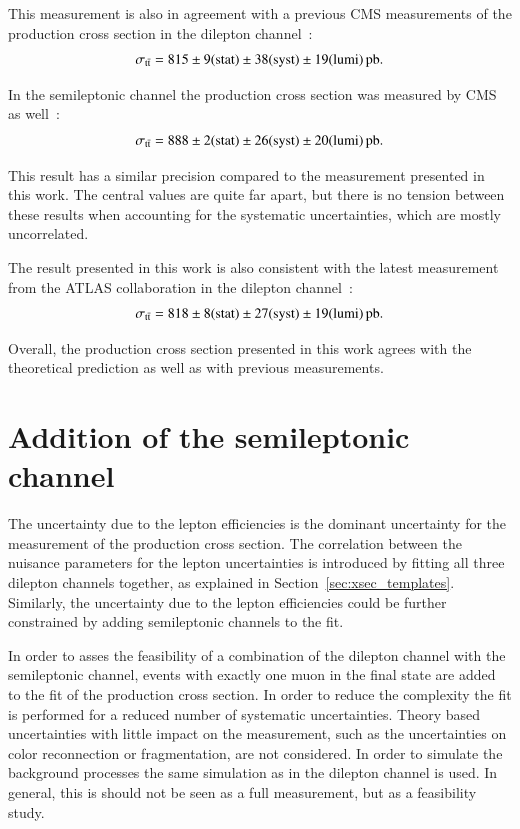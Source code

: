 This measurement is also in agreement with a previous CMS measurements of the \ttbar production cross section in the dilepton channel~\cite{Khachatryan:2016kzg}:
\begin{equation}
\sigma_{\mathrm{t}\bar{\mathrm{t}}} = 815 \pm  9 ({\rm stat}) \pm 38 ({\rm syst}) \pm 19 ({\rm lumi}) \mbox{\ensuremath{\,\text{pb}}}.
\end{equation}

In the semileptonic channel the \ttbar production cross section was measured by CMS as well~\cite{Sirunyan:2017uhy}:
\begin{equation}
\sigma_{\mathrm{t}\bar{\mathrm{t}}} = 888 \pm  2 ({\rm stat}) \pm 26 ({\rm syst}) \pm 20 ({\rm lumi}) \mbox{\ensuremath{\,\text{pb}}}.
\end{equation}

This result has a similar precision compared to the measurement presented in this work. The central values are quite far apart, but there is no tension between these results when accounting for the systematic uncertainties, which are mostly uncorrelated.

The result presented in this work is also consistent with the latest measurement from the ATLAS collaboration in the dilepton channel~\cite{Aaboud:2016pbd}:
\begin{equation}
\sigma_{\mathrm{t}\bar{\mathrm{t}}} = 818 \pm  8 ({\rm stat}) \pm 27 ({\rm syst}) \pm 19 ({\rm lumi}) \mbox{\ensuremath{\,\text{pb}}}.
\end{equation}

Overall, the \ttbar production cross section presented in this work agrees with the theoretical prediction as well as with previous measurements.


\section{Addition of the semileptonic channel}
\label{sec:res_semi}

The uncertainty due to the lepton efficiencies is the dominant uncertainty for the measurement of the \ttbar production cross section.
The correlation between the nuisance parameters for the lepton uncertainties is introduced by fitting all three dilepton channels together, as explained in Section~\ref{sec:xsec_templates}.
Similarly, the uncertainty due to the lepton efficiencies could be further constrained by adding semileptonic channels to the fit.

In order to asses the feasibility of a combination of the dilepton channel with the semileptonic channel, events with exactly one muon in the final state are added to the fit of the \ttbar production cross section.
In order to reduce the complexity the fit is performed for a reduced number of systematic uncertainties. Theory based uncertainties with little impact on the measurement, such as the uncertainties
on color reconnection or fragmentation, are not considered. 
In order to simulate the background processes the same simulation as in the dilepton channel is used.
In general, this is should not be seen as a full measurement, but as a feasibility study.

